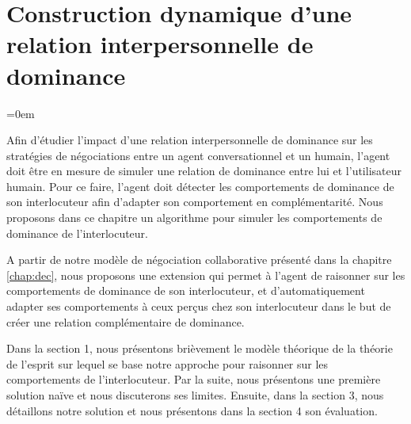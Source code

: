 \chapter[Relation interpersonnelle de dominance]{Construction dynamique d'une relation interpersonnelle de dominance}
\label{chap:Tom}
\begingroup
\parindent=0em
\localtableofcontents 
\clearpage
\endgroup

Afin d'étudier l'impact d'une relation interpersonnelle de dominance sur les stratégies de négociations entre un agent conversationnel et un humain, l'agent doit être en mesure de simuler une relation de dominance entre lui et l'utilisateur humain. Pour ce faire, l'agent doit détecter les comportements de dominance de son interlocuteur afin d'adapter son comportement en complémentarité. Nous proposons dans ce chapitre un algorithme pour simuler les comportements de dominance de l'interlocuteur. 

A partir de notre modèle de négociation collaborative présenté dans la chapitre \ref{chap:dec}, nous proposons une extension qui permet à l'agent de raisonner sur les comportements de dominance de son interlocuteur, et d'automatiquement adapter ses comportements à ceux perçus chez son interlocuteur dans le but de créer une relation complémentaire de dominance.

Dans la section 1, nous présentons brièvement le modèle théorique de la théorie de l'esprit sur lequel se base notre approche pour raisonner sur les comportements de l'interlocuteur. Par la suite, nous présentons une première solution naïve et nous discuterons ses limites. Ensuite, dans la section 3, nous détaillons notre solution et nous présentons dans la section 4 son évaluation.  




